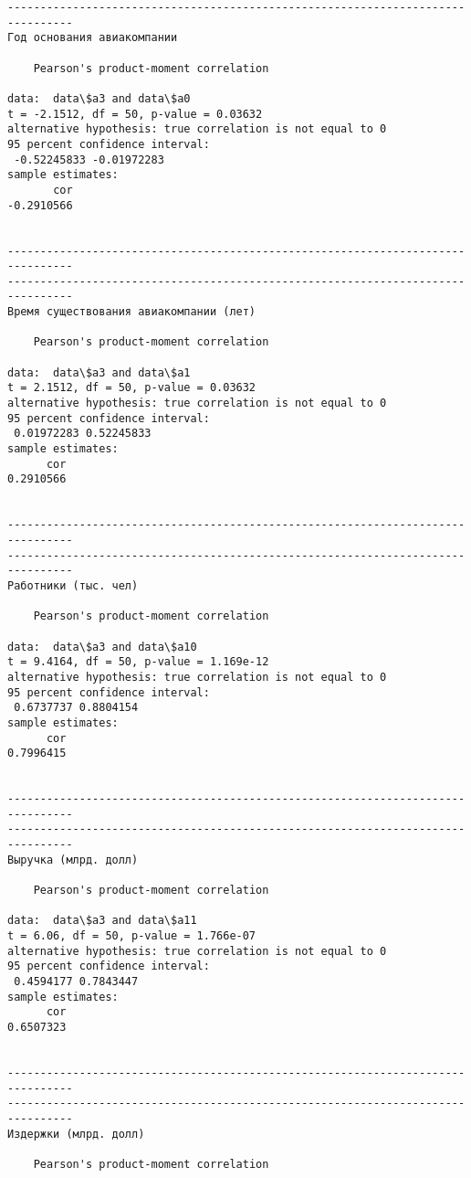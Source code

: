 \documentclass[11pt,mathletters]{article}
\begin{document}
    \begin{Verbatim}[commandchars=\\\{\}]
--------------------------------------------------------------------------------
Год основания авиакомпании

	Pearson's product-moment correlation

data:  data\$a3 and data\$a0
t = -2.1512, df = 50, p-value = 0.03632
alternative hypothesis: true correlation is not equal to 0
95 percent confidence interval:
 -0.52245833 -0.01972283
sample estimates:
       cor 
-0.2910566 


--------------------------------------------------------------------------------
--------------------------------------------------------------------------------
Время существования авиакомпании (лет)

	Pearson's product-moment correlation

data:  data\$a3 and data\$a1
t = 2.1512, df = 50, p-value = 0.03632
alternative hypothesis: true correlation is not equal to 0
95 percent confidence interval:
 0.01972283 0.52245833
sample estimates:
      cor 
0.2910566 


--------------------------------------------------------------------------------
--------------------------------------------------------------------------------
Работники (тыс. чел)

	Pearson's product-moment correlation

data:  data\$a3 and data\$a10
t = 9.4164, df = 50, p-value = 1.169e-12
alternative hypothesis: true correlation is not equal to 0
95 percent confidence interval:
 0.6737737 0.8804154
sample estimates:
      cor 
0.7996415 


--------------------------------------------------------------------------------
--------------------------------------------------------------------------------
Выручка (млрд. долл)

	Pearson's product-moment correlation

data:  data\$a3 and data\$a11
t = 6.06, df = 50, p-value = 1.766e-07
alternative hypothesis: true correlation is not equal to 0
95 percent confidence interval:
 0.4594177 0.7843447
sample estimates:
      cor 
0.6507323 


--------------------------------------------------------------------------------
--------------------------------------------------------------------------------
Издержки (млрд. долл)

	Pearson's product-moment correlation


\end{Verbatim}
\end{document}
